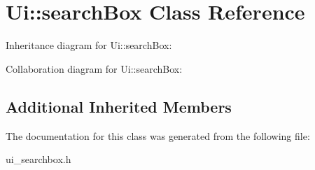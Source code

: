 \hypertarget{classUi_1_1searchBox}{}\section{Ui\+:\+:search\+Box Class Reference}
\label{classUi_1_1searchBox}


Inheritance diagram for Ui\+:\+:search\+Box\+:


Collaboration diagram for Ui\+:\+:search\+Box\+:
\subsection*{Additional Inherited Members}


The documentation for this class was generated from the following file\+:\begin{DoxyCompactItemize}
\item 
ui\+\_\+searchbox.\+h\end{DoxyCompactItemize}
